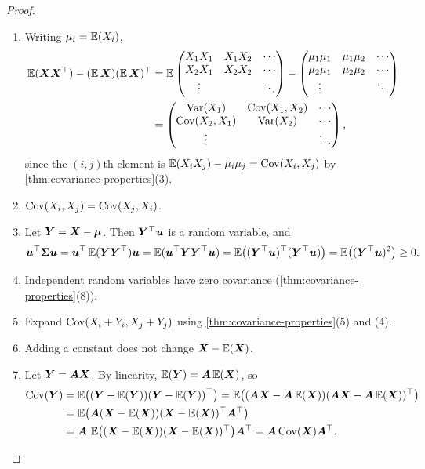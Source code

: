 \begin{proof}\leavevmode
\begin{enumerate}[leftmargin=*]
  \item[1.] Writing $\mu_i = \operatorname{\mathbb{E}}(X_i)$,
\begin{align*}
  \operatorname{\mathbb{E}}(\bm{X}\bm{X}^{\top}) - (\operatorname{\mathbb{E}}\bm{X})(\operatorname{\mathbb{E}}\bm{X})^{\top} &= \operatorname{\mathbb{E}}\begin{pmatrix} X_1X_1 & X_1X_2 & \cdots \\ X_2X_1 & X_2X_2 & \cdots \\ \vdots & & \ddots \end{pmatrix} - \begin{pmatrix} \mu_1\mu_1 & \mu_1\mu_2 & \cdots \\ \mu_2\mu_1 & \mu_2\mu_2 & \cdots \\ \vdots & & \ddots \end{pmatrix} \\
  &= \begin{pmatrix} \operatorname{Var}(X_1) & \operatorname{Cov}(X_1, X_2) & \cdots \\ \operatorname{Cov}(X_2, X_1) & \operatorname{Var}(X_2) & \cdots \\ \vdots & & \ddots \end{pmatrix},
\end{align*}
since the $(i,j)$th element is $\operatorname{\mathbb{E}}(X_iX_j) - \mu_i\mu_j = \operatorname{Cov}(X_i, X_j)$ by \cref{thm:covariance-properties}(3).
  \item[2.] $\operatorname{Cov}(X_i, X_j) = \operatorname{Cov}(X_j, X_i)$.
  \item[3.] Let $\bm{Y} = \bm{X} - \bm{\mu}$. Then $\bm{Y}^{\top}\bm{u}$ is a random variable, and
\[
  \bm{u}^{\top}\bm{\Sigma}\bm{u} = \bm{u}^{\top}\operatorname{\mathbb{E}}(\bm{Y}\bm{Y}^{\top})\bm{u} = \operatorname{\mathbb{E}}(\bm{u}^{\top}\bm{Y}\bm{Y}^{\top}\bm{u}) = \operatorname{\mathbb{E}}\bigl((\bm{Y}^{\top}\bm{u})^{\top}(\bm{Y}^{\top}\bm{u})\bigr) = \operatorname{\mathbb{E}}\bigl((\bm{Y}^{\top}\bm{u})^2\bigr) \ge 0.
\]
  \item[4.] Independent random variables have zero covariance (\cref{thm:covariance-properties}(8)).
  \item[5.] Expand $\operatorname{Cov}(X_i + Y_i, X_j + Y_j)$ using \cref{thm:covariance-properties}(5) and (4).
  \item[6.] Adding a constant does not change $\bm{X} - \operatorname{\mathbb{E}}(\bm{X})$.
  \item[7.] Let $\bm{Y} = \bm{A}\bm{X}$. By linearity, $\operatorname{\mathbb{E}}(\bm{Y}) = \bm{A}\operatorname{\mathbb{E}}(\bm{X})$, so
\begin{align*}
  \operatorname{Cov}(\bm{Y}) &= \operatorname{\mathbb{E}}\bigl((\bm{Y} - \operatorname{\mathbb{E}}(\bm{Y}))(\bm{Y} - \operatorname{\mathbb{E}}(\bm{Y}))^{\top}\bigr) = \operatorname{\mathbb{E}}\bigl((\bm{A}\bm{X} - \bm{A}\operatorname{\mathbb{E}}(\bm{X}))(\bm{A}\bm{X} - \bm{A}\operatorname{\mathbb{E}}(\bm{X}))^{\top}\bigr) \\
  &= \operatorname{\mathbb{E}}\bigl(\bm{A}(\bm{X} - \operatorname{\mathbb{E}}(\bm{X}))(\bm{X} - \operatorname{\mathbb{E}}(\bm{X}))^{\top}\bm{A}^{\top}\bigr) \\
  &= \bm{A}\,\operatorname{\mathbb{E}}\bigl((\bm{X} - \operatorname{\mathbb{E}}(\bm{X}))(\bm{X} - \operatorname{\mathbb{E}}(\bm{X}))^{\top}\bigr)\bm{A}^{\top} = \bm{A}\operatorname{Cov}(\bm{X})\bm{A}^{\top}. \qedhere
\end{align*}
\end{enumerate}
\end{proof}

